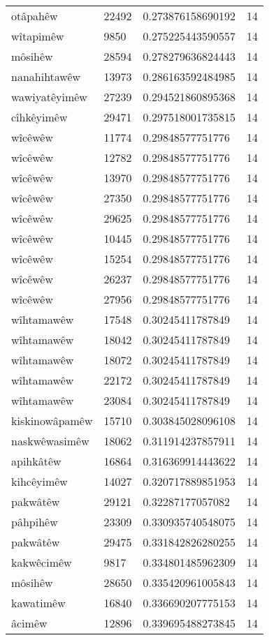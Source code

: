 \begin{longtable}{llll}
otâpahêw & 22492 & 0.273876158690192 & 14\\
wîtapimêw & 9850 & 0.275225443590557 & 14\\
môsihêw & 28594 & 0.278279636824443 & 14\\
nanahihtawêw & 13973 & 0.286163592484985 & 14\\
wawiyatêyimêw & 27239 & 0.294521860895368 & 14\\
cîhkêyimêw & 29471 & 0.297518001735815 & 14\\
wîcêwêw & 11774 & 0.29848577751776 & 14\\
wîcêwêw & 12782 & 0.29848577751776 & 14\\
wîcêwêw & 13970 & 0.29848577751776 & 14\\
wîcêwêw & 27350 & 0.29848577751776 & 14\\
wîcêwêw & 29625 & 0.29848577751776 & 14\\
wîcêwêw & 10445 & 0.29848577751776 & 14\\
wîcêwêw & 15254 & 0.29848577751776 & 14\\
wîcêwêw & 26237 & 0.29848577751776 & 14\\
wîcêwêw & 27956 & 0.29848577751776 & 14\\
wîhtamawêw & 17548 & 0.30245411787849 & 14\\
wîhtamawêw & 18042 & 0.30245411787849 & 14\\
wîhtamawêw & 18072 & 0.30245411787849 & 14\\
wîhtamawêw & 22172 & 0.30245411787849 & 14\\
wîhtamawêw & 23084 & 0.30245411787849 & 14\\
kiskinowâpamêw & 15710 & 0.303845028096108 & 14\\
naskwêwasimêw & 18062 & 0.311914237857911 & 14\\
apihkâtêw & 16864 & 0.316369914443622 & 14\\
kihcêyimêw & 14027 & 0.320717889851953 & 14\\
pakwâtêw & 29121 & 0.32287177057082 & 14\\
pâhpihêw & 23309 & 0.330935740548075 & 14\\
pakwâtêw & 29475 & 0.331842826280255 & 14\\
kakwêcimêw & 9817 & 0.334801485962309 & 14\\
môsihêw & 28650 & 0.335420961005843 & 14\\
kawatimêw & 16840 & 0.336690207775153 & 14\\
âcimêw & 12896 & 0.339695488273845 & 14\\

\end{longtable}
